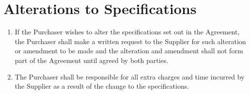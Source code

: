 \documentclass[nz-terms]{subfiles}
\begin{document}
\section{Alterations to Specifications}

\begin{enumerate}
\item If the Purchaser wishes to alter the specifications set out in the
Agreement, the Purchaser shall make a written request to the Supplier for
such alteration or amendment to be made and the alteration and amendment
shall not form part of the Agreement until agreed by both parties.
\item The Purchaser shall be responsible for all extra charges and time incurred
by the Supplier as a result of the change to the specifications.
\end{enumerate}
\end{document}
